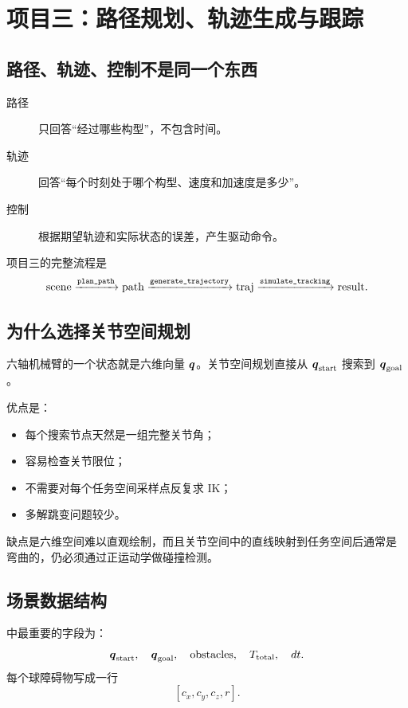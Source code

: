 \chapter{项目三：路径规划、轨迹生成与跟踪}

\section{路径、轨迹、控制不是同一个东西}

\begin{description}
  \item[路径] 只回答“经过哪些构型”，不包含时间。
  \item[轨迹] 回答“每个时刻处于哪个构型、速度和加速度是多少”。
  \item[控制] 根据期望轨迹和实际状态的误差，产生驱动命令。
\end{description}

项目三的完整流程是
\[
\text{scene}
\xrightarrow{\texttt{plan\_path}}
\text{path}
\xrightarrow{\texttt{generate\_trajectory}}
\text{traj}
\xrightarrow{\texttt{simulate\_tracking}}
\text{result}.
\]

\section{为什么选择关节空间规划}

六轴机械臂的一个状态就是六维向量 $\boldsymbol{q}$。关节空间规划直接从
$\boldsymbol{q}_{\mathrm{start}}$ 搜索到 $\boldsymbol{q}_{\mathrm{goal}}$。

优点是：
\begin{itemize}
  \item 每个搜索节点天然是一组完整关节角；
  \item 容易检查关节限位；
  \item 不需要对每个任务空间采样点反复求 IK；
  \item 多解跳变问题较少。
\end{itemize}

缺点是六维空间难以直观绘制，而且关节空间中的直线映射到任务空间后通常是
弯曲的，仍必须通过正运动学做碰撞检测。

\section{场景数据结构}

 中最重要的字段为：
\[
\boldsymbol{q}_{\mathrm{start}},\quad
\boldsymbol{q}_{\mathrm{goal}},\quad
\text{obstacles},\quad T_{\mathrm{total}},\quad dt.
\]
每个球障碍物写成一行
\[
[c_x,c_y,c_z,r].
\]

